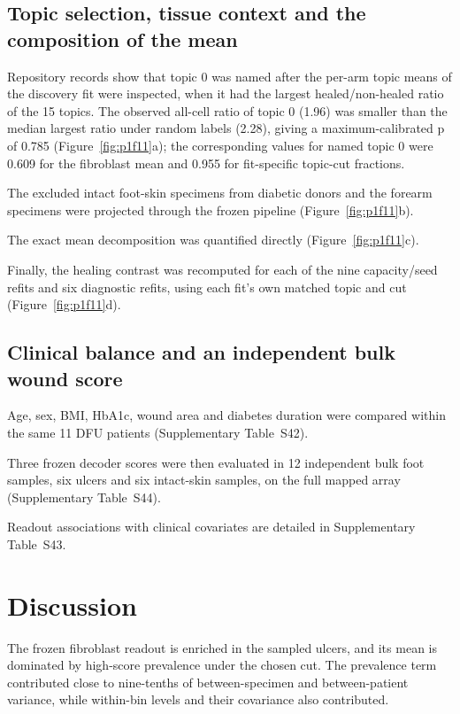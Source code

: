 \documentclass[10pt,a4paper]{article}
\begin{document}
\subsection{Topic selection, tissue context and the composition of the mean}

Repository records show that topic 0 was named after the per-arm topic means of the discovery fit were inspected, when it had the largest healed/non-healed ratio of the 15 topics. The observed all-cell ratio of topic 0 (1.96) was smaller than the median largest ratio under random labels (2.28), giving a maximum-calibrated p of 0.785 (Figure~\ref{fig:p1f11}a\label{call:p1f11}); the corresponding values for named topic 0 were 0.609 for the fibroblast mean and 0.955 for fit-specific topic-cut fractions.

The excluded intact foot-skin specimens from diabetic donors and the forearm specimens were projected through the frozen pipeline (Figure~\ref{fig:p1f11}b).

The exact mean decomposition was quantified directly (Figure~\ref{fig:p1f11}c).

Finally, the healing contrast was recomputed for each of the nine capacity/seed refits and six diagnostic refits, using each fit's own matched topic and cut (Figure~\ref{fig:p1f11}d).



\subsection{Clinical balance and an independent bulk wound score}

Age, sex, BMI, HbA1c, wound area and diabetes duration were compared within the same 11 DFU patients (Supplementary Table~S42).

Three frozen decoder scores were then evaluated in 12 independent bulk foot samples, six ulcers and six intact-skin samples, on the full mapped array (Supplementary Table~S44).

Readout associations with clinical covariates are detailed in Supplementary Table~S43.

\section{Discussion}

The frozen fibroblast readout is enriched in the sampled ulcers, and its mean is dominated by high-score prevalence under the chosen cut. The prevalence term contributed close to nine-tenths of between-specimen and between-patient variance, while within-bin levels and their covariance also contributed.
\end{document}
